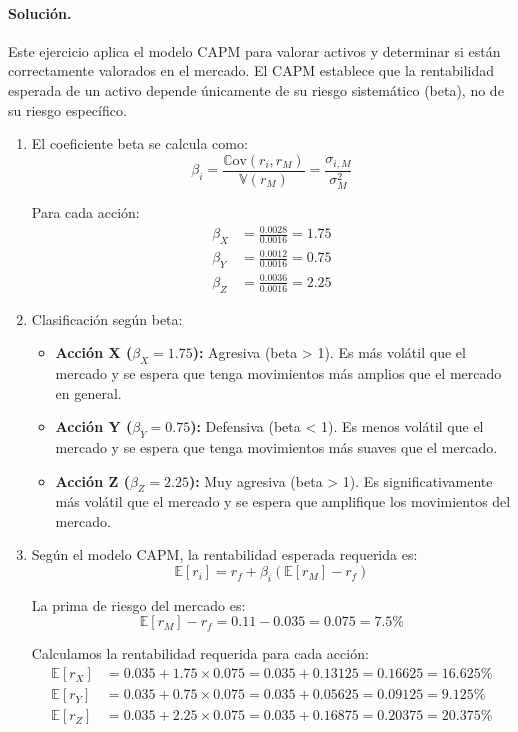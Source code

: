 \documentclass[12pt,a4paper]{article}
\newcommand{\E}{\mathbb{E}}
\newcommand{\V}{\mathbb{V}}
\newcommand{\Cov}{\mathbb{C}\text{ov}}
\newenvironment{solucion}{\paragraph{Solución.}}{}
\begin{document}
\begin{solucion}
Este ejercicio aplica el modelo CAPM para valorar activos y determinar si están correctamente valorados en el mercado. El CAPM establece que la rentabilidad esperada de un activo depende únicamente de su riesgo sistemático (beta), no de su riesgo específico.

\begin{enumerate}[label=\alph*)]
  \item El coeficiente beta se calcula como:
  \[
  \beta_i = \frac{\Cov(r_i, r_M)}{\V(r_M)} = \frac{\sigma_{i,M}}{\sigma_M^2}
  \]
  
  Para cada acción:
  \begin{align*}
  \beta_X &= \frac{0.0028}{0.0016} = 1.75 \\
  \beta_Y &= \frac{0.0012}{0.0016} = 0.75 \\
  \beta_Z &= \frac{0.0036}{0.0016} = 2.25
  \end{align*}

  \item Clasificación según beta:
  \begin{itemize}
    \item \textbf{Acción X ($\beta_X = 1.75$):} Agresiva (beta > 1). Es más volátil que el mercado y se espera que tenga movimientos más amplios que el mercado en general.
    \item \textbf{Acción Y ($\beta_Y = 0.75$):} Defensiva (beta < 1). Es menos volátil que el mercado y se espera que tenga movimientos más suaves que el mercado.
    \item \textbf{Acción Z ($\beta_Z = 2.25$):} Muy agresiva (beta > 1). Es significativamente más volátil que el mercado y se espera que amplifique los movimientos del mercado.
  \end{itemize}

  \item Según el modelo CAPM, la rentabilidad esperada requerida es:
  \[
  \E[r_i] = r_f + \beta_i (\E[r_M] - r_f)
  \]
  
  La prima de riesgo del mercado es:
  \[
  \E[r_M] - r_f = 0.11 - 0.035 = 0.075 = 7.5\%
  \]
  
  Calculamos la rentabilidad requerida para cada acción:
  \begin{align*}
  \E[r_X] &= 0.035 + 1.75 \times 0.075 = 0.035 + 0.13125 = 0.16625 = 16.625\% \\
  \E[r_Y] &= 0.035 + 0.75 \times 0.075 = 0.035 + 0.05625 = 0.09125 = 9.125\% \\
  \E[r_Z] &= 0.035 + 2.25 \times 0.075 = 0.035 + 0.16875 = 0.20375 = 20.375\%
  \end{align*}


\end{enumerate}
\end{solucion}
\end{document}

